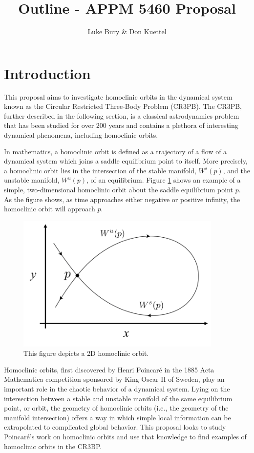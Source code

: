 \documentclass{article}
\title{Outline - APPM 5460 Proposal}
\author{Luke Bury \& Don Kuettel}
\begin{document}
\maketitle

\section{Introduction}
This proposal aims to investigate homoclinic orbits in the dynamical system known as the Circular Restricted Three-Body Problem (CR3PB). The CR3PB, further described in the following section, is a classical astrodynamics problem that has been studied for over 200 years and contains a plethora of interesting dynamical phenomena, including homoclinic orbits. 

In mathematics, a homoclinic orbit is defined as a trajectory of a flow of a dynamical system which joins a saddle equilibrium point to itself. More precisely, a homoclinic orbit lies in the intersection of the stable manifold, $W^s(p)$, and the unstable manifold, $W^u(p)$, of an equilibrium. Figure \ref{f:homoclinic_example} shows an example of a simple, two-dimensional homoclinic orbit about the saddle equilibrium point $p$. As the figure shows, as time approaches either negative or positive infinity, the homoclinic orbit will approach $p$. 

\begin{figure}[h!]
    \centering
    \includegraphics[width=4in]{homoclinic_orbit.png}
    \caption{This figure depicts a 2D homoclinic orbit.}
    \label{f:homoclinic_example}
\end{figure}

Homoclinic orbits, first discovered by Henri Poincaré in the 1885 Acta Mathematica competition sponsored by King Oscar II of Sweden, play an important role in the chaotic behavior of a dynamical system. Lying on the intersection between a stable and unstable manifold of the same equilibrium point, or orbit, the geometry of homoclinic orbits (i.e., the geometry of the manifold intersection) offers a way in which simple local information can be extrapolated to complicated global behavior. This proposal looks to study Poincaré's work on homoclinic orbits and use that knowledge to find examples of homoclinic orbits in the CR3BP.




\end{document}
